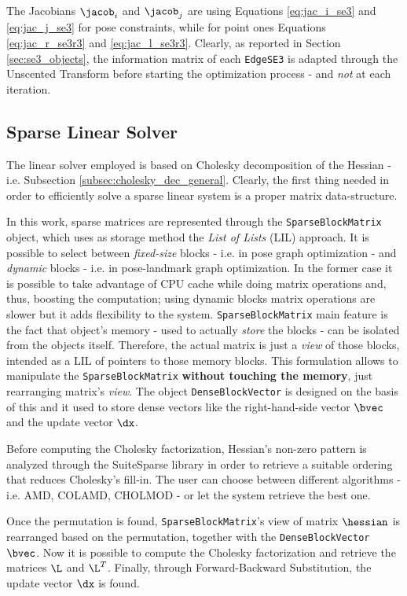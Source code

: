 The Jacobians $\jacob_i$ and $\jacob_j$ are using Equations \ref{eq:jac_i_se3} and \ref{eq:jac_j_se3} for pose constraints, while for point ones Equations \ref{eq:jac_r_se3r3} and \ref{eq:jac_l_se3r3}. Clearly, as reported in Section \ref{sec:se3_objects}, the information matrix of each \texttt{EdgeSE3} is adapted through the Unscented Transform before starting the optimization process - and \textit{not} at each iteration.

\subsection{Sparse Linear Solver}\label{subsec:sparse_linear_solver}
The linear solver employed is based on Cholesky decomposition of the Hessian - i.e. Subsection \ref{subsec:cholesky_dec_general}. Clearly, the first thing needed in order to efficiently solve a sparse linear system is a proper matrix data-structure.

In this work, sparse matrices are represented through the \texttt{SparseBlockMatrix} object, which uses as storage method the \textit{List of Lists} (LIL) approach. It is possible to select between \textit{fixed-size} blocks - i.e. in pose graph optimization - and \textit{dynamic} blocks - i.e. in pose-landmark graph optimization. In the former case it is possible to take advantage of CPU cache while doing matrix operations and, thus, boosting the computation; using dynamic blocks matrix operations are slower but it adds flexibility to the system. \texttt{SparseBlockMatrix} main feature is the fact that object's memory - used to actually \textit{store} the blocks - can be isolated from the objects itself. Therefore, the actual matrix is just a \textit{view} of those blocks, intended as a LIL of pointers to those memory blocks. This formulation allows to manipulate the \texttt{SparseBlockMatrix} \textbf{without touching the memory}, just rearranging matrix's \textit{view}. The object \texttt{DenseBlockVector} is designed  on the basis of this and it used to store dense vectors like the right-hand-side vector $\bvec$ and the update vector $\dx$.

Before computing the Cholesky factorization, Hessian's non-zero pattern is analyzed through the SuiteSparse library in order to retrieve a suitable ordering that reduces Cholesky's fill-in. The user can choose between different algorithms - i.e. AMD, COLAMD, CHOLMOD - or let the system retrieve the best one.

Once the permutation is found, \texttt{SparseBlockMatrix}'s view of matrix $\hessian$ is rearranged based on the permutation, together with the \texttt{DenseBlockVector} $\bvec$. Now it is possible to compute the Cholesky factorization and retrieve the matrices $\L$ and $\L^T$. Finally, through Forward-Backward Substitution, the update vector $\dx$ is found.


